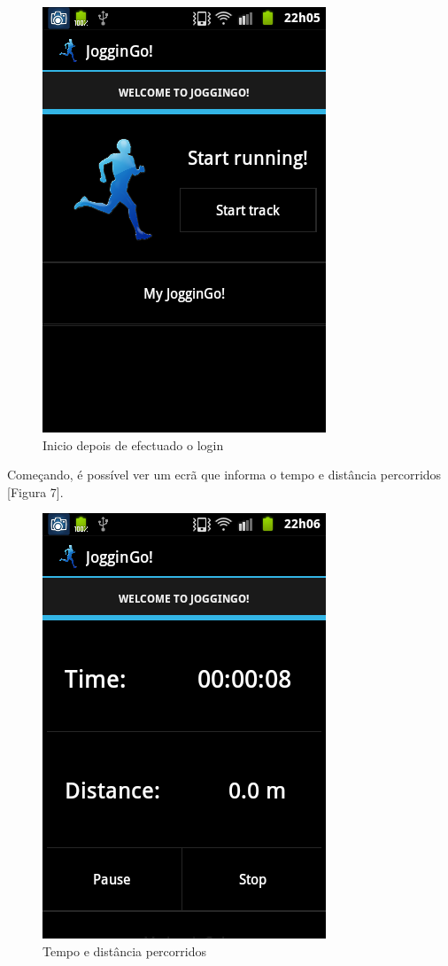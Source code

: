 \documentclass[15pt,a4paper]{article}
\begin{document}
\begin{figure}[htp]
  \centering
  \includegraphics[scale=0.5]{android_3.png}
  \caption{Inicio depois de efectuado o login}
\end{figure}

Começando, é possível ver um ecrã que informa o tempo e distância percorridos [Figura 7]. 

\begin{figure}[htp]
  \centering
  \includegraphics[scale=0.5]{android_4.png}
  \caption{Tempo e distância percorridos}
\end{figure}
\end{document}
